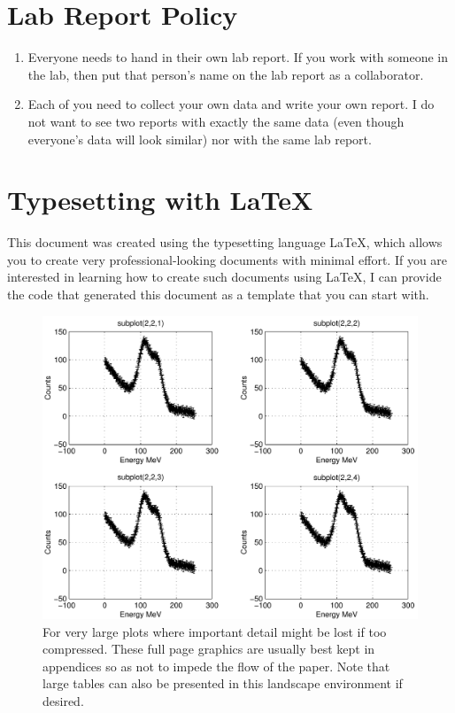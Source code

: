 \appendix
\section{Lab Report Policy}
\begin{enumerate}
\item Everyone needs to hand in their own lab report. If you work with someone
in the lab, then put that person's name on the lab report as a collaborator.
\item Each of you need to collect your own data and write your own report. I do
not want to see two reports with exactly the same data (even though everyone's
data will look similar) nor with the same lab report.
\end{enumerate}

\section{Typesetting with \LaTeX}
This document was created using the typesetting language \LaTeX, which allows
you to create very professional-looking documents with minimal effort. If you
are interested in learning how to create such documents using \LaTeX, I can
provide the code that generated this document as a template that you can start
with.




\begin{turnpage}
\begin{figure}[p]
\includegraphics[width=20cm]{./figures/sample-fig5}
\caption{For very large plots where important detail might be lost
if too compressed. These full page graphics are usually best kept in
appendices so as not to impede the flow of the paper.  Note that
large tables can also be presented in this landscape environment if
desired.} 
\label{fig:landscapegraphic}
\end{figure}
\end{turnpage}

